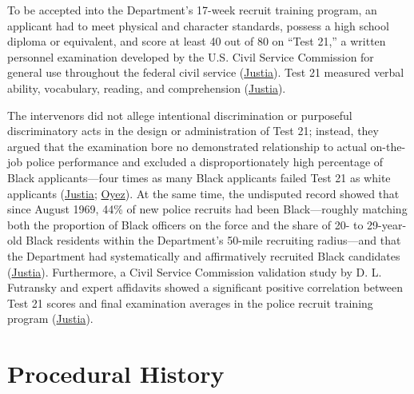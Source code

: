 \documentclass[12pt]{article}
\begin{document}
To be accepted into the Department's 17-week recruit training program, an applicant had to meet physical and character standards, possess a high school diploma or equivalent, and score at least 40 out of 80 on ``Test 21,'' a written personnel examination developed by the U.S. Civil Service Commission for general use throughout the federal civil service (\href{https://supreme.justia.com/cases/federal/us/426/229/}{Justia}). Test 21 measured verbal ability, vocabulary, reading, and comprehension (\href{https://supreme.justia.com/cases/federal/us/426/229/}{Justia}).

The intervenors did not allege intentional discrimination or purposeful discriminatory acts in the design or administration of Test 21; instead, they argued that the examination bore no demonstrated relationship to actual on-the-job police performance and excluded a disproportionately high percentage of Black applicants---four times as many Black applicants failed Test 21 as white applicants (\href{https://supreme.justia.com/cases/federal/us/426/229/}{Justia}; \href{https://www.oyez.org/cases/1975/74-1492}{Oyez}). At the same time, the undisputed record showed that since August 1969, 44\% of new police recruits had been Black---roughly matching both the proportion of Black officers on the force and the share of 20- to 29-year-old Black residents within the Department's 50-mile recruiting radius---and that the Department had systematically and affirmatively recruited Black candidates (\href{https://supreme.justia.com/cases/federal/us/426/229/}{Justia}). Furthermore, a Civil Service Commission validation study by D. L. Futransky and expert affidavits showed a significant positive correlation between Test 21 scores and final examination averages in the police recruit training program (\href{https://supreme.justia.com/cases/federal/us/426/229/}{Justia}).

\section{Procedural History}
\end{document}
